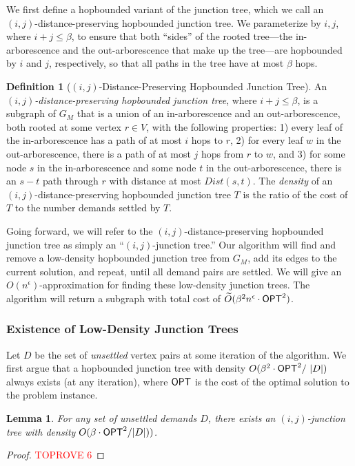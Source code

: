 \documentclass{article}
\newtheorem{lemma}[theorem]{Lemma}
\theoremstyle{definition}
\newtheorem{definition}{Definition}
\theoremstyle{remark}
\def\opt {{\sf OPT}}
\begin{document}
We first define a hopbounded variant of the junction tree, which we call an $(i,j)$-distance-preserving hopbounded junction tree. We parameterize by $i,j$, where $i+j \leq \beta$, to ensure that both ``sides'' of the rooted tree---the in-arborescence and the out-arborescence that make up the tree---are hopbounded by $i$ and $j$, respectively, so that all paths in the tree have at most $\beta$ hops. 

\begin{definition}[$(i,j)$-Distance-Preserving Hopbounded Junction Tree] 
     An \textit{$(i,j)$-distance-preserving hopbounded junction tree}, where $i + j \leq \beta$, is a subgraph of $G_M$ that is a union of an in-arborescence and an out-arborescence, both rooted at some vertex $r \in V$, with the following properties: 1) every leaf of the in-arborescence has a path of at most $i$ hops to $r$, 2) for every leaf $w$ in the out-arborescence, there is a path of at most $j$ hops from $r$ to $w$, and 3) for some node $s$ in the in-arborescence and some node $t$ in the out-arborescence, there is an  $s-t$ path through $r$ with distance at most $Dist(s,t)$. The \textit{density} of an $(i,j)$-distance-preserving hopbounded junction tree $T$ is the ratio of the cost of $T$ to the number demands settled by $T$. 
\end{definition}

Going forward, we will refer to the $(i,j)$-distance-preserving hopbounded junction tree as simply an ``$(i,j)$-junction tree.'' Our algorithm will find and remove a low-density hopbounded junction tree from $G_M$, add its edges to the current solution, and repeat, until all demand pairs are settled. 
We will give an $O(n^\epsilon)$-approximation for finding these low-density junction trees. The algorithm will return a subgraph with total cost of $\widetilde{O} (\beta^2 n^\epsilon \cdot {{\opt}}^2 )$.

\subsubsection{Existence of Low-Density Junction Trees}
Let $D$ be the set of \textit{unsettled} vertex pairs at some iteration of the algorithm.
We first argue that a hopbounded junction tree with density $O (\beta^2 \cdot {\opt}^2 / \mbox{ } |D| )$ always exists (at any iteration), where ${\opt}$ is the cost of the optimal solution to the problem instance. 

\begin{lemma}
\label{lem:existence}
    For any set of unsettled demands $D$, there exists an $(i,j)$-junction tree with density $O(\beta \cdot {{\opt}}^2 / |D|) )$.
\end{lemma}
\begin{proof}\textcolor{red}{TOPROVE 6}\end{proof}
\end{document}
